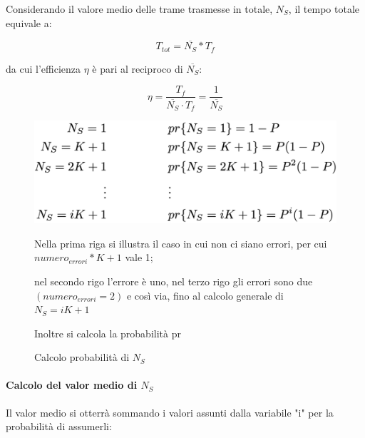 Considerando il valore medio delle trame trasmesse in totale, $N_S$, il tempo totale equivale a:
        
        \begin{equation}
        T_{tot} = \overline{N_S} * T_f 
        \end{equation}
        
        da cui l'efficienza $\eta$ è pari al reciproco di $\overline{N_S}$:

        \begin{equation}
        \eta = \frac{T_f}{\overline{N_S} \cdot T_f} = \frac{1}{\overline{N_S}}
        \end{equation}

        \begin{figure}[htbp]
            \centering
            \begin{minipage}{0.4\textwidth}
                \includegraphics[width=\linewidth]{images/gbnns.png}
                \caption{Calcolo probabilità di $N_S$}
            \end{minipage}%
            \hfill
            \begin{minipage}{0.55\textwidth}
                Nella prima riga si illustra il caso in cui non ci siano errori, per cui $numero_{errori}*K + 1$ vale 1;

                nel secondo rigo l'errore è uno, nel terzo rigo gli errori sono due$(numero_{errori} = 2)$ e così via, fino al calcolo generale di $N_S = iK + 1$

                Inoltre si calcola la probabilità pr 
            \end{minipage}
        \end{figure}
\paragraph{Calcolo del valor medio di $N_S$}

Il valor medio si otterrà sommando i valori assunti dalla variabile "i" per la probabilità di assumerli:

